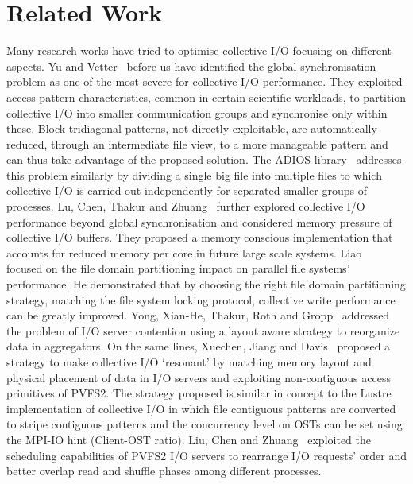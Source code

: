 \section{Related Work}
\label{sec: related}
Many research works have tried to optimise collective I/O focusing on different aspects. Yu and Vetter~\cite{WeikuanV08} before us have identified the global synchronisation problem as one of the most severe for collective I/O performance. They exploited 
access pattern characteristics, common in certain scientific workloads, to partition collective I/O into smaller communication groups and synchronise only within these. Block-tridiagonal patterns, not directly exploitable, are automatically reduced, 
through an intermediate file view, to a more manageable pattern and can thus take advantage of the proposed solution. The ADIOS library~\cite{CPE:CPE3125} addresses this problem similarly by dividing a single big file into multiple files to which 
collective I/O is carried out independently for separated smaller groups of processes. Lu, Chen, Thakur and Zhuang~\cite{YinYTY12} further explored collective I/O performance beyond global synchronisation and considered memory pressure of collective 
I/O buffers. They proposed a memory conscious implementation that accounts for reduced memory per core in future large scale systems. Liao~\cite{Liao11} focused on the file domain partitioning impact on parallel file systems' performance. 
He demonstrated that by choosing the right file domain partitioning strategy, matching the file system locking protocol, collective write performance can be greatly improved. Yong, Xian-He, Thakur, Roth and Gropp~\cite{YongXTRG11} addressed the 
problem of I/O server contention using a layout aware strategy to reorganize data in aggregators. On the same lines, Xuechen, Jiang and Davis~\cite{XuechenJD09} proposed a strategy to make collective I/O `resonant' by matching memory layout and 
physical placement of data in I/O servers and exploiting non-contiguous access primitives of PVFS2. The strategy proposed is similar in concept to the Lustre implementation of collective I/O in which file contiguous patterns are converted to stripe 
contiguous patterns and the concurrency level on OSTs can be set using the MPI-IO hint  (Client-OST ratio). Liu, Chen and Zhuang~\cite{JilianYY13} exploited the scheduling capabilities of PVFS2 I/O servers to 
rearrange I/O requests' order and better overlap read and shuffle phases among different processes. 

